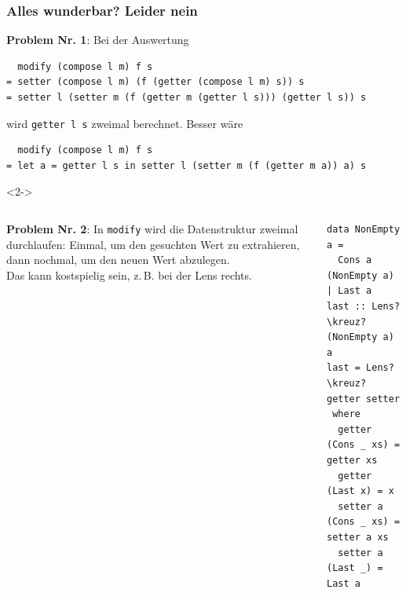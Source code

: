 \documentclass{beamer}
\newcommand{\kreuz}{$\,^\dag$} %
\begin{document}
\begin{frame}[fragile]
  \frametitle{Alles wunderbar? Leider nein}

  \textbf{Problem Nr. 1}: Bei der Auswertung
\begin{verbatim}
  modify (compose l m) f s
= setter (compose l m) (f (getter (compose l m) s)) s
= setter l (setter m (f (getter m (getter l s))) (getter l s)) s
\end{verbatim}
  wird \texttt{getter l s} zweimal berechnet.
  Besser wäre
\begin{verbatim}
  modify (compose l m) f s
= let a = getter l s in setter l (setter m (f (getter m a)) a) s
\end{verbatim}

  \begin{visibleenv}<2->
    \begin{columns}[t]

      \textbf{Problem Nr. 2}: In \texttt{modify} wird die Datenstruktur zweimal durchlaufen: Einmal, um den gesuchten Wert zu extrahieren, dann nochmal, um den neuen Wert abzulegen. \\
      Das kann kostspielig sein, z.\,B. bei der Lens rechts.
\begin{verbatim}
data NonEmpty a =
  Cons a (NonEmpty a) | Last a
last :: Lens?\kreuz? (NonEmpty a) a
last = Lens?\kreuz? getter setter
 where
  getter (Cons _ xs) = getter xs
  getter (Last x) = x
  setter a (Cons _ xs) = setter a xs
  setter a (Last _) = Last a
\end{verbatim}
    \end{columns}
  \end{visibleenv}
\end{frame}
\end{document}
